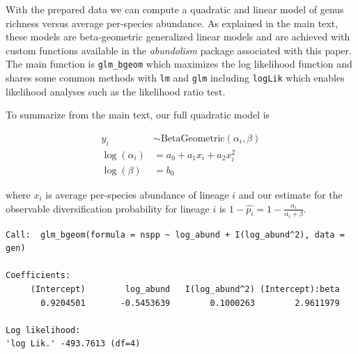 \documentclass[
  letterpaper,
  DIV=11,
  numbers=noendperiod]{scrartcl}
\newenvironment{Shaded}{\begin{snugshade}}{\end{snugshade}}
\newcommand{\AttributeTok}[1]{\textcolor[rgb]{0.40,0.45,0.13}{#1}}
\newcommand{\CommentTok}[1]{\textcolor[rgb]{0.37,0.37,0.37}{#1}}
\newcommand{\DecValTok}[1]{\textcolor[rgb]{0.68,0.00,0.00}{#1}}
\newcommand{\FunctionTok}[1]{\textcolor[rgb]{0.28,0.35,0.67}{#1}}
\newcommand{\NormalTok}[1]{\textcolor[rgb]{0.00,0.23,0.31}{#1}}
\newcommand{\OtherTok}[1]{\textcolor[rgb]{0.00,0.23,0.31}{#1}}
\newcommand{\SpecialCharTok}[1]{\textcolor[rgb]{0.37,0.37,0.37}{#1}}
\begin{document}
With the prepared data we can compute a quadratic and linear model of
genus richness versus average per-species abundance. As explained in the
main text, these models are beta-geometric generalized linear models and
are achieved with custom functions available in the \emph{abundolism}
package associated with this paper. The main function is
\texttt{glm\_bgeom} which maximizes the log likelihood function and
shares some common methods with \texttt{lm} and \texttt{glm} including
\texttt{logLik} which enables likelihood analyses such as the likelihood
ratio test.

To summarize from the main text, our full quadratic model is

\[
\begin{aligned}
y_i &\sim \text{BetaGeometric}(\alpha_i, \beta) \\
\log(\alpha_i) &= a_0 + a_1 x_i + a_2 x_i^2 \\
\log(\beta) &= b_0
\end{aligned}
\]

where \(x_i\) is average per-species abundance of lineage \(i\) and our
estimate for the observable diversification probability for lineage
\(i\) is \(1 - \hat{p_i} = 1 - \frac{\alpha_i}{\alpha_i + \beta}\).

\begin{Shaded}
\end{Shaded}

\begin{verbatim}
Call:  glm_bgeom(formula = nspp ~ log_abund + I(log_abund^2), data = gen)

Coefficients: 
     (Intercept)        log_abund   I(log_abund^2) (Intercept):beta 
       0.9204501       -0.5453639        0.1000263        2.9611979 

Log likelihood: 
'log Lik.' -493.7613 (df=4)
\end{verbatim}
\end{document}
